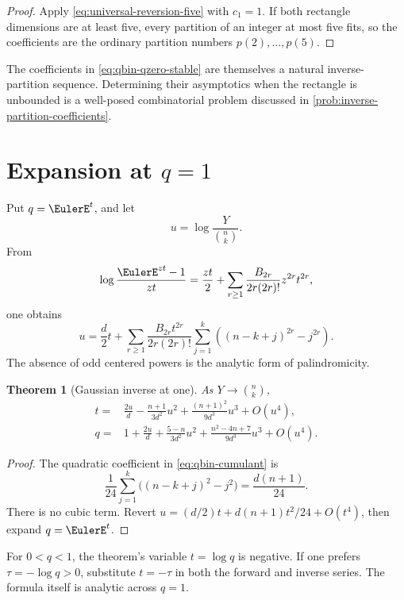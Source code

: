\documentclass[11pt,a4paper,oneside,openany]{book}
\newtheorem{theorem}{Theorem}[chapter]
\theoremstyle{definition}
\theoremstyle{remark}
\begin{document}
\begin{proof}
Apply \eqref{eq:universal-reversion-five} with \(c_1=1\).  If both rectangle
dimensions are at least five, every partition of an integer at most five
fits, so the coefficients are the ordinary partition numbers
\(p(2),\ldots,p(5)\).
\end{proof}

The coefficients in \eqref{eq:qbin-qzero-stable} are themselves a natural
inverse-partition sequence.  Determining their asymptotics when the rectangle
is unbounded is a well-posed combinatorial problem discussed in
\cref{prob:inverse-partition-coefficients}.

\section{Expansion at \texorpdfstring{$q=1$}{q=1}}

Put \(q=\EulerE^t\), and let
\[
 u=\log\frac{Y}{\binom nk}.
\]
From
\[
 \log\frac{\EulerE^{zt}-1}{zt}
 =\frac{zt}{2}+\sum_{r\ge1}
 \frac{B_{2r}}{2r(2r)!}z^{2r}t^{2r},
\]
one obtains
\begin{equation}\label{eq:qbin-cumulant}
 u=\frac d2t+\sum_{r\ge1}\frac{B_{2r}t^{2r}}{2r(2r)!}
 \sum_{j=1}^{k}\left((n-k+j)^{2r}-j^{2r}\right).
\end{equation}
The absence of odd centered powers is the analytic form of palindromicity.

\begin{theorem}[Gaussian inverse at one]\label{thm:qbin-qone}
As \(Y\to\binom nk\),
\begin{align}
 t={}&\frac{2u}{d}-\frac{n+1}{3d^2}u^2
 +\frac{(n+1)^2}{9d^3}u^3+O(u^4),
\label{eq:qbin-t-one}\\
 q={}&1+\frac{2u}{d}+\frac{5-n}{3d^2}u^2
 +\frac{n^2-4n+7}{9d^3}u^3+O(u^4).
\label{eq:qbin-q-one}
\end{align}
\end{theorem}

\begin{proof}
The quadratic coefficient in \eqref{eq:qbin-cumulant} is
\[
 \frac1{24}\sum_{j=1}^{k}\bigl((n-k+j)^2-j^2\bigr)
 =\frac{d(n+1)}{24}.
\]
There is no cubic term.  Revert
\(u=(d/2)t+d(n+1)t^2/24+O(t^4)\), then expand
\(q=\EulerE^t\).
\end{proof}

For \(0<q<1\), the theorem's variable \(t=\log q\) is negative.
If one prefers \(\tau=-\log q>0\), substitute \(t=-\tau\) in both
the forward and inverse series.  The formula itself is analytic across
\(q=1\).
\end{document}
